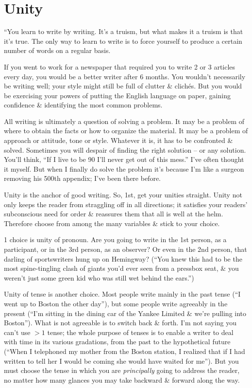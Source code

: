 \documentclass{article}
\begin{document}

\section{Unity}
``You learn to write by writing. It's a truism, but what makes it a truism is that it's true. The only way to learn to write is to force yourself to produce a certain number of words on a regular basis.

If you went to work for a newspaper that required you to write 2 or 3 articles every day, you would be a better writer after 6 months. You wouldn't necessarily be writing well; your style might still be full of clutter \& clich\'es. But you would be exercising your powers of putting the English language on paper, gaining confidence \& identifying the most common problems.

All writing is ultimately a question of solving a problem. It may be a problem of where to obtain the facts or how to organize the material. It may be a problem of approach or attitude, tone or style. Whatever it is, it has to be confronted \& solved. Sometimes you will despair of finding the right solution -- or any solution. You'll think, ``If I live to be 90 I'll never get out of this mess.'' I've often thought it myself. But when I finally do solve the problem it's because I'm like a surgeon removing his 500th appendix; I've been there before.

Unity is the anchor of good writing. So, 1st, get your unities straight. Unity not only keeps the reader from straggling off in all directions; it satisfies your readers' subconscious need for order \& reassures them that all is well at the helm. Therefore choose from among the many variables \& stick to your choice.

1 choice is unity of pronoun. Are you going to write in the 1st person, as a participant, or in the 3rd person, as an observer? Or even in the 2nd person, that darling of sportswriters hung up on Hemingway? (``You knew this had to be the most spine-tingling clash of giants you'd ever seen from a pressbox seat, \& you weren't just some green kid who was still wet behind the ears.'')

Unity of tense is another choice. Most people write mainly in the past tense (``I went up to Boston the other day''), but some people write agreeably in the present (``I'm sitting in the dining car of the Yankee Limited \& we're pulling into Boston''). What is not agreeable is to switch back \& forth. I'm not saying you can't use $> 1$ tense; the whole purpose of tenses is to enable a writer to deal with time in its various gradations, from the past to the hypothetical future (``When I telephoned my mother from the Boston station, I realized that if I had written to tell her I would be coming she would have waited for me''). But you must choose the tense in which you are \textit{principally} going to address the reader, no matter how many glances you may take backward \& forward along the way.
\end{document}
